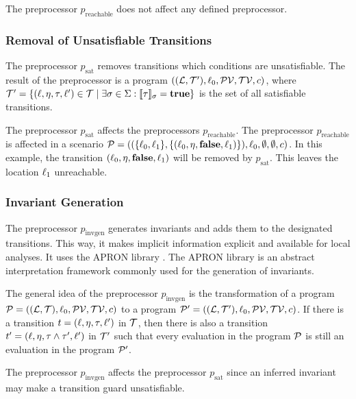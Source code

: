 The preprocessor $p_{\text{reachable}}$ does not affect any defined preprocessor.

\subsubsection{Removal of Unsatisfiable Transitions}

The preprocessor $p_{\text{sat}}$ removes transitions which conditions are unsatisfiable.
The result of the preprocessor is a program $((\mathcal{L}, \mathcal{T}'), \ell_0, \mathcal{PV}, \mathcal{TV}, c)$, where $\mathcal{T}' = \lbrace (\ell,\eta,\tau,\ell') \in \mathcal{T} \mid \exists \sigma \in \Sigma: \llbracket \tau \rrbracket_{\sigma} = \textbf{true} \rbrace$ is the set of all satisfiable transitions.

The preprocessor $p_{\text{sat}}$ affects the preprocessors $p_{\text{reachable}}$.
The preprocessor $p_{\text{reachable}}$ is affected in a scenario $\mathcal{P} = ((\lbrace \ell_0, \ell_1 \rbrace, \lbrace (\ell_0,\eta,\textbf{false},\ell_1) \rbrace), \ell_0, \emptyset, \emptyset, c)$.
In this example, the transition $(\ell_0,\eta,\textbf{false},\ell_1)$ will be removed by $p_{\text{sat}}$.
This leaves the location $\ell_1$ unreachable.

\subsubsection{Invariant Generation}

The preprocessor $p_{\text{invgen}}$ generates invariants and adds them to the designated transitions.
This way, it makes implicit information explicit and available for local analyses.
It uses the APRON library \cite{apron}.
The APRON library is an abstract interpretation framework commonly used for the generation of invariants.

The general idea of the preprocessor $p_{\text{invgen}}$ is the transformation of a program $\mathcal{P} = ((\mathcal{L}, \mathcal{T}), \ell_0, \mathcal{PV}, \mathcal{TV}, c)$ to a program $\mathcal{P}' = ((\mathcal{L}, \mathcal{T}'), \ell_0, \mathcal{PV}, \mathcal{TV}, c)$.
If there is a transition $t = (\ell, \eta, \tau, \ell')$ in $\mathcal{T}$, then there is also a transition $t' = (\ell, \eta, \tau \wedge \tau', \ell')$ in $\mathcal{T}'$ such that every evaluation in the program $\mathcal{P}$ is still an evaluation in the program $\mathcal{P}'$.

The preprocessor $p_{\text{invgen}}$ affects the preprocessor $p_{\text{sat}}$ since an inferred invariant may make a transition guard unsatisfiable.

